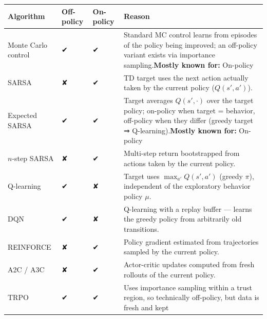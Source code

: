 \documentclass[11pt]{article}
\newcounter{none}
\begin{document}
{\def\LTcaptype{none} %
\begin{longtable}[]{@{}
  >{\raggedright\arraybackslash}p{}
  >{\raggedright\arraybackslash}p{}
  >{\raggedright\arraybackslash}p{}
  >{\raggedright\arraybackslash}p{}@{}}
\toprule\noalign{}
\begin{minipage}[b]{\linewidth}\raggedright
Algorithm
\end{minipage} & \begin{minipage}[b]{\linewidth}\raggedright
Off-policy
\end{minipage} & \begin{minipage}[b]{\linewidth}\raggedright
On-policy
\end{minipage} & \begin{minipage}[b]{\linewidth}\raggedright
Reason
\end{minipage} \\
\midrule\noalign{}
\endhead
\bottomrule\noalign{}
\endlastfoot
Monte Carlo control & ✔ & ✔ & Standard MC control learns from episodes
of the policy being improved; an off-policy variant exists via
importance sampling.\textbf{Mostly known for:} On-policy \\
SARSA & ✘ & ✔ & TD target uses the next action actually taken by the
current policy (\(Q(s',a')\)). \\
Expected SARSA & ✔ & ✔ & Target averages \(Q(s',\cdot)\) over the target
policy; on-policy when target = behavior, off-policy when they differ
(greedy target ⇒ Q-learning).\textbf{Mostly known for:} On-policy \\
\(n\)-step SARSA & ✘ & ✔ & Multi-step return bootstrapped from actions
taken by the current policy. \\
Q-learning & ✔ & ✘ & Target uses \(\max_{a'} Q(s',a')\) (greedy
\(\pi\)), independent of the exploratory behavior policy \(\mu\). \\
DQN & ✔ & ✘ & Q-learning with a replay buffer --- learns the greedy
policy from arbitrarily old transitions. \\
REINFORCE & ✘ & ✔ & Policy gradient estimated from trajectories sampled
by the current policy. \\
A2C / A3C & ✘ & ✔ & Actor-critic updates computed from fresh rollouts of
the current policy. \\
TRPO & ✔ & ✔ & Uses importance sampling within a trust region, so
technically off-policy, but data is fresh and kept

\end{longtable}}
\end{document}
